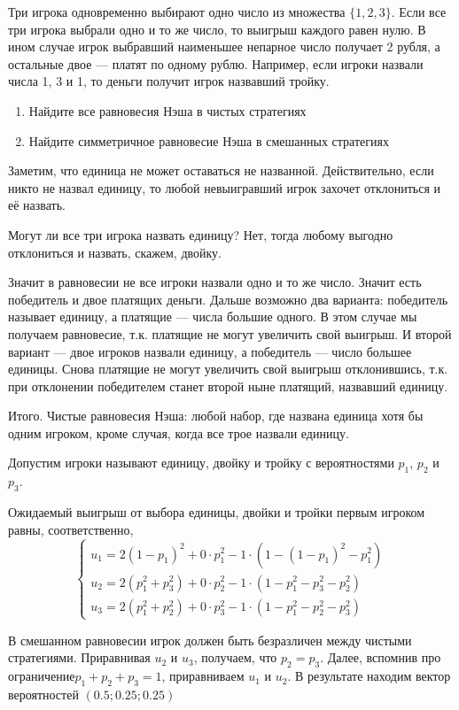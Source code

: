 \begin{problem}
Три игрока одновременно выбирают одно число из множества $\{1,2,3\}$. Если все три игрока выбрали одно и то же число, то выигрыш каждого равен нулю. В ином случае игрок выбравший наименьшее непарное число получает 2 рубля, а остальные двое --- платят по одному рублю. Например, если игроки назвали числа 1, 3 и 1, то деньги получит игрок назвавший тройку. 
\begin{enumerate}
\item  Найдите все равновесия Нэша в чистых стратегиях 
\item  Найдите симметричное равновесие Нэша в смешанных стратегиях 
\end{enumerate}
\end{problem}

\begin{solution}
Заметим, что единица не может оставаться не названной. Действительно, если никто не назвал единицу, то любой невыигравший игрок захочет отклониться и её назвать.  

Могут ли все три игрока назвать единицу? Нет, тогда любому выгодно отклониться и назвать, скажем, двойку. 

Значит в равновесии не все игроки назвали одно и то же число. Значит есть победитель и двое платящих деньги.  Дальше возможно два варианта: победитель называет единицу, а платящие --- числа большие одного. В этом случае мы получаем равновесие, т.к. платящие не могут увеличить свой выигрыш. И второй вариант --- двое игроков назвали единицу, а победитель --- число большее единицы. Снова платящие не могут увеличить свой выигрыш отклонившись, т.к. при отклонении победителем станет второй ныне платящий, назвавший единицу.

Итого. Чистые равновесия Нэша: любой набор, где названа единица хотя бы одним игроком, кроме случая, когда все трое назвали единицу.

Допустим игроки называют единицу, двойку и тройку с вероятностями $p_1$, $p_2$ и $p_3$.

Ожидаемый выигрыш от выбора единицы, двойки и тройки первым игроком равны, соответственно,
\[
\begin{cases}
u_1= 2(1-p_1)^2+0\cdot p_1^2-1\cdot (1-(1-p_1)^2-p_1^2) \\
u_2 = 2(p_1^2+p_3^2)+0\cdot p_2^2-1\cdot (1-p_1^2-p_3^2-p_2^2) \\
u_3= 2(p_1^2+p_2^2)+0\cdot p_3^2-1\cdot(1-p_1^2-p_2^2-p_3^2)
\end{cases}
\]

В смешанном равновесии игрок должен быть безразличен между чистыми стратегиями. Приравнивая $u_2$ и $u_3$, получаем, что $p_2=p_3$. Далее, вспомнив про ограничение$p_1+p_2+p_3=1$, приравниваем $u_1$ и $u_2$. В результате находим вектор вероятностей  $(0.5;0.25;0.25)$ 
\end{solution}

